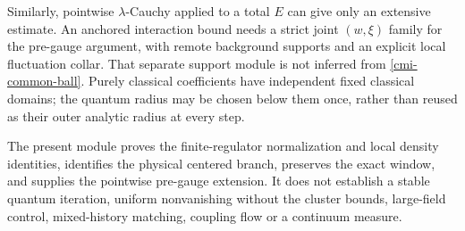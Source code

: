 Similarly, pointwise $\lambda$-Cauchy applied to a total
$E$ can give only an extensive estimate. An anchored
interaction bound needs a strict joint $(w,\xi)$ family
for the pre-gauge argument, with remote background
supports and an explicit local fluctuation collar.
That separate support module is not inferred from
\eqref{cmi-common-ball}. Purely classical coefficients
have independent fixed classical domains; the quantum
radius may be chosen below them once, rather than
reused as their outer analytic radius at every step.

The present module proves the finite-regulator
normalization and local density identities, identifies
the physical centered branch, preserves the exact
window, and supplies the pointwise pre-gauge extension.
It does not establish a stable quantum iteration,
uniform nonvanishing without the cluster bounds,
large-field control, mixed-history matching, coupling
flow or a continuum measure.
